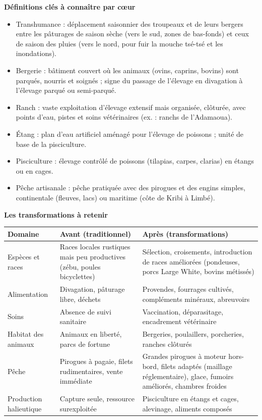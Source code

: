 \documentclass[11pt]{article}
\newcommand{\cle}[1]{{\popxbold\color{popdark}#1}}
\begin{document}
\begin{bilan}
\textbf{Définitions clés à connaître par cœur}
\begin{itemize}
  \item \cle{Transhumance} : déplacement saisonnier des troupeaux et de leurs bergers entre les pâturages de saison sèche (vers le sud, zones de bas-fonds) et ceux de saison des pluies (vers le nord, pour fuir la mouche tsé-tsé et les inondations).
  \item \cle{Bergerie} : bâtiment couvert où les animaux (ovins, caprins, bovins) sont parqués, nourris et soignés ; signe du passage de l'élevage en divagation à l'élevage parqué ou semi-parqué.
  \item \cle{Ranch} : vaste exploitation d'élevage extensif mais organisée, clôturée, avec points d'eau, pistes et soins vétérinaires (ex. : ranchs de l'Adamaoua).
  \item \cle{Étang} : plan d'eau artificiel aménagé pour l'élevage de poissons ; unité de base de la pisciculture.
  \item \cle{Pisciculture} : élevage contrôlé de poissons (tilapias, carpes, clarias) en étangs ou en cages.
  \item \cle{Pêche artisanale} : pêche pratiquée avec des pirogues et des engins simples, continentale (fleuves, lacs) ou maritime (côte de Kribi à Limbé).
\end{itemize}

\textbf{Les transformations à retenir}
\begin{center}
\begin{tabularx}{\linewidth}{|l|X|X|}\hline
\rowcolor{popblueL} \textbf{Domaine} & \textbf{Avant (traditionnel)} & \textbf{Après (transformations)} \\ \hline
Espèces et races & Races locales rustiques mais peu productives (zébu, poules bicyclettes) & Sélection, croisements, introduction de races améliorées (pondeuses, porcs Large White, bovins métissés) \\ \hline
Alimentation & Divagation, pâturage libre, déchets & Provendes, fourrages cultivés, compléments minéraux, abreuvoirs \\ \hline
Soins & Absence de suivi sanitaire & Vaccination, déparasitage, encadrement vétérinaire \\ \hline
Habitat des animaux & Animaux en liberté, parcs de fortune & Bergeries, poulaillers, porcheries, ranches clôturés \\ \hline
Pêche & Pirogues à pagaie, filets rudimentaires, vente immédiate & Grandes pirogues à moteur hors-bord, filets adaptés (maillage réglementaire), glace, fumoirs améliorés, chambres froides \\ \hline
Production halieutique & Capture seule, ressource surexploitée & Pisciculture en étangs et cages, alevinage, aliments composés \\ \hline
\end{tabularx}
\end{center}


\end{bilan}
\end{document}
